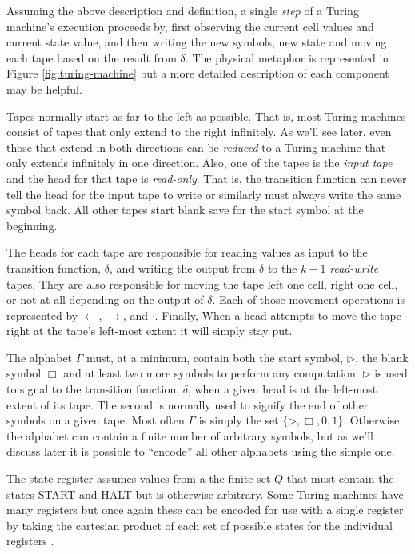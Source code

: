 \documentclass[usletter]{article}
\begin{document}
Assuming the above description and definition, a single \textit{step} of a Turing machine's execution proceeds by, first observing the current cell values and current state value, and then writing the new symbols, new state and moving each tape based on the result from $\delta$. The physical metaphor is represented in Figure \ref{fig:turing-machine} but a more detailed description of each component may be helpful.

Tapes normally start as far to the left as possible. That is, most Turing machines consist of tapes that only extend to the right infinitely. As we'll see later, even those that extend in both directions can be \textit{reduced} to a Turing machine that only extends infinitely in one direction. Also, one of the tapes is the \textit{input tape} and the head for that tape is \textit{read-only}. That is, the transition function can never tell the head for the input tape to write or similarly must always write the same symbol back. All other tapes start blank save for the start symbol at the beginning.

The heads for each tape are responsible for reading values as input to the transition function, $\delta$, and writing the output from $\delta$ to the $k-1$ \textit{read-write} tapes. They are also responsible for moving the tape left one cell, right one cell, or not at all depending on the output of $\delta$. Each of those movement operations is represented by $\leftarrow$, $\rightarrow$, and $\cdot$. Finally, When a head attempts to move the tape right at the tape's left-most extent it will simply stay put.

The alphabet $\Gamma$ must, at a minimum, contain both the start symbol, $\rhd$, the blank symbol $\Box$ and at least two more symbols to perform any computation. $\rhd$ is used to signal to the transition function, $\delta$, when a given head is at the left-most extent of its tape. The second is normally used to signify the end of other symbols on a given tape. Most often $\Gamma$ is simply the set $\{\rhd, \Box, 0, 1\}$. Otherwise the alphabet can contain a finite number of arbitrary symbols, but as we'll discuss later it is possible to ``encode'' all other alphabets using the simple one.

The state register assumes values from a the finite set $Q$ that must contain the states \textsf{START} and \textsf{HALT} but is otherwise arbitrary. Some Turing machines have many registers but once again these can be encoded for use with a single register by taking the cartesian product of each set of possible states for the individual registers \cite{textbook}.
\end{document}
